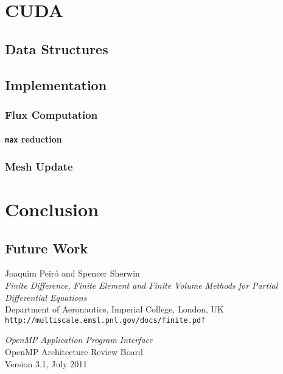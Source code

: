 \documentclass[9pt,twocolumn]{scrartcl}
\newcommand{\paragraphh}[1]{\paragraph{#1\hfill}\hfill

}
\begin{document}
\section{CUDA}
\label{sec:cuda}
\subsection{Data Structures}
\subsection{Implementation}
\subsubsection{Flux Computation}
\paragraphh{\texttt{max} reduction}
\subsubsection{Mesh Update}

\section{Conclusion}
\subsection{Future Work}



\begin{thebibliography}{12345}

	Joaquim Peiró and Spencer Sherwin	\\
	\textit{Finite Difference, Finite Element and Finite Volume Methods for Partial Differential Equations}	\\
	Department of Aeronautics, Imperial College, London, UK	\\
	\texttt{\smaller http://multiscale.emsl.pnl.gov/docs/finite.pdf}

	\textit{OpenMP Application Program Interface}	\\
	OpenMP Architecture Review Board	\\
	Version 3.1, July 2011

\end{thebibliography}
\end{document}
